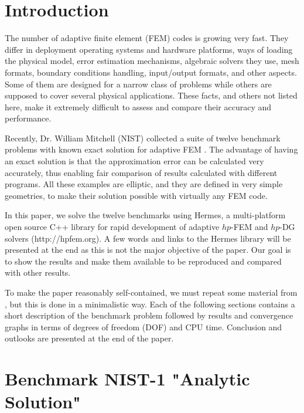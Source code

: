 \documentclass[12pt]{elsarticle}
\begin{document}
\section{Introduction}
\label{sec:intro}

The number of adaptive finite element (FEM) codes is growing very fast. 
They differ in deployment operating systems and hardware platforms, 
ways of loading the physical model, error estimation mechanisms, 
algebraic solvers they use, mesh formats, boundary conditions 
handling, input/output formats, and other aspects. Some of them are 
designed for a narrow class of problems while others are supposed to 
cover several physical applications. These facts, and others not listed
here, make it extremely difficult to assess and compare their accuracy and performance.

Recently, Dr. William Mitchell (NIST) collected a suite of
twelve benchmark problems with known exact solution for adaptive 
FEM \cite{mitchell-1}. The advantage of having an exact solution is that 
the approximation error can be calculated very accurately, thus 
enabling fair comparison of results calculated with different
programs. All these examples are elliptic, and they are defined  
in very simple geometries, to make their solution possible with 
virtually any FEM code. 

In this paper, we solve the twelve benchmarks using 
Hermes, a multi-platform open source C++
library for rapid development of adaptive $hp$-FEM
and $hp$-DG solvers (http://hpfem.org). A few words
and links to the Hermes library will be presented at the 
end as this is not the major objective of the paper.
Our goal is to show the results and make them available 
to be reproduced and compared with other results.
 
To make the paper reasonably self-contained, we must repeat some 
material from \cite{mitchell-1}, but this is done in a minimalistic way.
Each of the following sections contains a short description of 
the benchmark problem followed by results and convergence graphs in terms of degrees
of freedom (DOF) and CPU time. Conclusion and outlooks
are presented at the end of the paper.


\section{Benchmark NIST-1 "Analytic Solution"}
\label{sec:bench-1}
\end{document}

